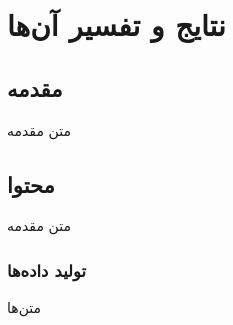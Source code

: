 \section{نتایج و تفسیر آن‌ها}\label{sec:results}

\subsection{مقدمه}\label{subsec:results_intro}
متن مقدمه

\subsection{محتوا}\label{subsec:results_mohtava}
متن مقدمه

\subsubsection{تولید داده‌ها}
متن‌ها



\cleardoublepage 